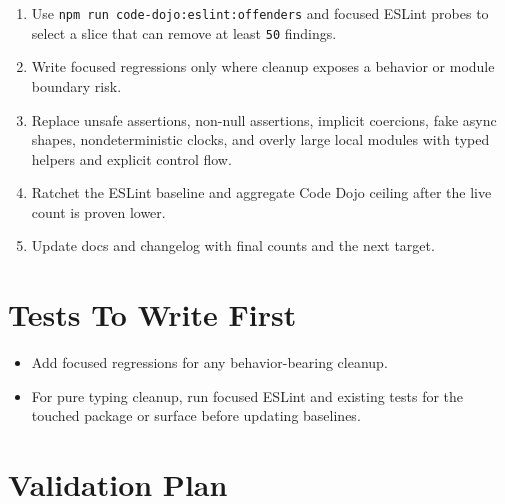 \begin{enumerate}
\def\labelenumi{\arabic{enumi}.}
\tightlist
\item
  Use \texttt{n\allowbreak{}p\allowbreak{}m\allowbreak{} \allowbreak{}r\allowbreak{}u\allowbreak{}n\allowbreak{} \allowbreak{}c\allowbreak{}o\allowbreak{}d\allowbreak{}e\allowbreak{}-\allowbreak{}d\allowbreak{}o\allowbreak{}j\allowbreak{}o\allowbreak{}:\allowbreak{}e\allowbreak{}s\allowbreak{}l\allowbreak{}i\allowbreak{}n\allowbreak{}t\allowbreak{}:\allowbreak{}o\allowbreak{}f\allowbreak{}f\allowbreak{}e\allowbreak{}n\allowbreak{}d\allowbreak{}e\allowbreak{}r\allowbreak{}s} and focused ESLint probes to select a slice that can remove at least \texttt{5\allowbreak{}0} findings.
\item
  Write focused regressions only where cleanup exposes a behavior or module boundary risk.
\item
  Replace unsafe assertions, non-null assertions, implicit coercions, fake async shapes, nondeterministic clocks, and overly large local modules with typed helpers and explicit control flow.
\item
  Ratchet the ESLint baseline and aggregate Code Dojo ceiling after the live count is proven lower.
\item
  Update docs and changelog with final counts and the next target.
\end{enumerate}

\section{Tests To Write First}\label{record-237-tests-to-write-first}

\begin{itemize}
\tightlist
\item
  Add focused regressions for any behavior-bearing cleanup.
\item
  For pure typing cleanup, run focused ESLint and existing tests for the touched package or surface before updating baselines.
\end{itemize}

\section{Validation Plan}\label{record-237-validation-plan}

